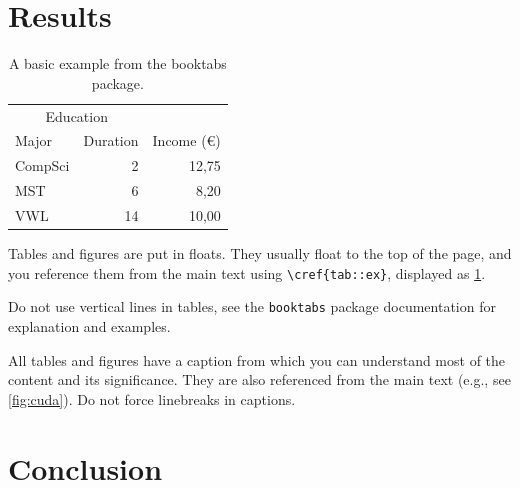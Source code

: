 \documentclass[runningheads,a4paper]{llncs}
\begin{document}
\section{Results}

    \begin{table}
        \centering
        \begin{tabular}{@{}lrr@{}} 
            \toprule
            \multicolumn{2}{c}{Education}\\ \cmidrule{1-2}
            Major & Duration & Income (\euro)\\ 
            \midrule 
            CompSci & 2 & 12,75 \\ \addlinespace
            MST & 6 & 8,20 \\ \addlinespace
            VWL & 14 & 10,00\\ 
            \bottomrule
        \end{tabular}
        \caption[Table Example]{A basic example from the booktabs package.}
        \label{tab::ex}
    \end{table}

Tables  and  figures are  put  in  floats.  They  usually float  to  the
top  of  the  page,  and  you  reference them  from  the  main  text  using
\verb+\cref{tab::ex}+, displayed as \cref{tab::ex}.

Do  not use  vertical  lines  in tables,  see  the \verb+booktabs+  package
documentation for explanation and examples.

All tables and  figures have a caption from which  you can understand most 
of the  content and its significance.   They are also referenced  from the 
main  text  (e.g.,  see  \cref{fig:cuda}).  Do  not  force  linebreaks  in 
captions.  


\section{Conclusion}

\printbibliography
\end{document}
